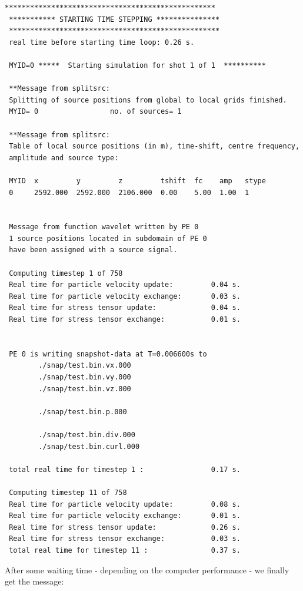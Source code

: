 \documentclass[11pt,onecolumn,oneside]{article}
\begin{document}
\begin{verbatim} 
**************************************************
 *********** STARTING TIME STEPPING ***************
 **************************************************
 real time before starting time loop: 0.26 s.

 MYID=0 *****  Starting simulation for shot 1 of 1  **********

 **Message from splitsrc:
 Splitting of source positions from global to local grids finished.
 MYID= 0                 no. of sources= 1

 **Message from splitsrc:
 Table of local source positions (in m), time-shift, centre frequency, 
 amplitude and source type:

 MYID  x         y         z         tshift  fc    amp   stype
 0     2592.000  2592.000  2106.000  0.00    5.00  1.00  1


 Message from function wavelet written by PE 0
 1 source positions located in subdomain of PE 0
 have been assigned with a source signal.

 Computing timestep 1 of 758
 Real time for particle velocity update:         0.04 s.
 Real time for particle velocity exchange:       0.03 s.
 Real time for stress tensor update:             0.04 s.
 Real time for stress tensor exchange:           0.01 s.


 PE 0 is writing snapshot-data at T=0.006600s to
        ./snap/test.bin.vx.000
        ./snap/test.bin.vy.000
        ./snap/test.bin.vz.000

        ./snap/test.bin.p.000

        ./snap/test.bin.div.000
        ./snap/test.bin.curl.000

 total real time for timestep 1 :                0.17 s.

 Computing timestep 11 of 758
 Real time for particle velocity update:         0.08 s.
 Real time for particle velocity exchange:       0.01 s.
 Real time for stress tensor update:             0.26 s.
 Real time for stress tensor exchange:           0.03 s.
 total real time for timestep 11 :               0.37 s.
\end{verbatim}
After some waiting time - depending on the computer performance - we finally get the message:
\end{document}
